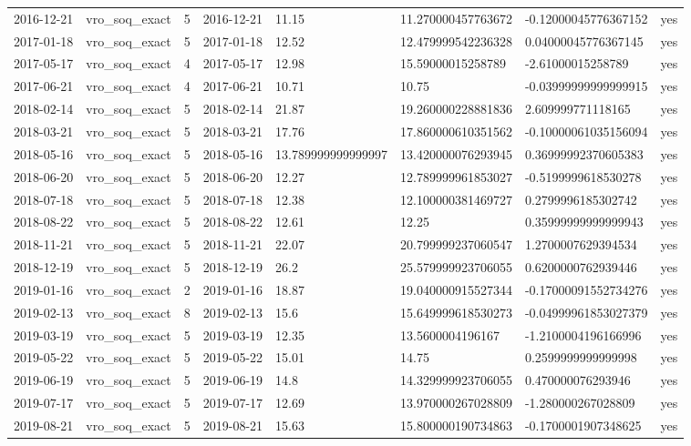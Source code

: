 \begin{tabular}{llllllll}
2016-12-21 & vro\_soq\_exact & 5 & 2016-12-21 & 11.15 & 11.270000457763672 & -0.12000045776367152 & yes \\
2017-01-18 & vro\_soq\_exact & 5 & 2017-01-18 & 12.52 & 12.479999542236328 & 0.04000045776367145 & yes \\
2017-05-17 & vro\_soq\_exact & 4 & 2017-05-17 & 12.98 & 15.59000015258789 & -2.61000015258789 & yes \\
2017-06-21 & vro\_soq\_exact & 4 & 2017-06-21 & 10.71 & 10.75 & -0.03999999999999915 & yes \\
2018-02-14 & vro\_soq\_exact & 5 & 2018-02-14 & 21.87 & 19.260000228881836 & 2.609999771118165 & yes \\
2018-03-21 & vro\_soq\_exact & 5 & 2018-03-21 & 17.76 & 17.860000610351562 & -0.10000061035156094 & yes \\
2018-05-16 & vro\_soq\_exact & 5 & 2018-05-16 & 13.789999999999997 & 13.420000076293945 & 0.36999992370605383 & yes \\
2018-06-20 & vro\_soq\_exact & 5 & 2018-06-20 & 12.27 & 12.789999961853027 & -0.5199999618530278 & yes \\
2018-07-18 & vro\_soq\_exact & 5 & 2018-07-18 & 12.38 & 12.100000381469727 & 0.2799996185302742 & yes \\
2018-08-22 & vro\_soq\_exact & 5 & 2018-08-22 & 12.61 & 12.25 & 0.35999999999999943 & yes \\
2018-11-21 & vro\_soq\_exact & 5 & 2018-11-21 & 22.07 & 20.799999237060547 & 1.2700007629394534 & yes \\
2018-12-19 & vro\_soq\_exact & 5 & 2018-12-19 & 26.2 & 25.579999923706055 & 0.6200000762939446 & yes \\
2019-01-16 & vro\_soq\_exact & 2 & 2019-01-16 & 18.87 & 19.040000915527344 & -0.17000091552734276 & yes \\
2019-02-13 & vro\_soq\_exact & 8 & 2019-02-13 & 15.6 & 15.649999618530273 & -0.04999961853027379 & yes \\
2019-03-19 & vro\_soq\_exact & 5 & 2019-03-19 & 12.35 & 13.5600004196167 & -1.2100004196166996 & yes \\
2019-05-22 & vro\_soq\_exact & 5 & 2019-05-22 & 15.01 & 14.75 & 0.2599999999999998 & yes \\
2019-06-19 & vro\_soq\_exact & 5 & 2019-06-19 & 14.8 & 14.329999923706055 & 0.470000076293946 & yes \\
2019-07-17 & vro\_soq\_exact & 5 & 2019-07-17 & 12.69 & 13.970000267028809 & -1.280000267028809 & yes \\
2019-08-21 & vro\_soq\_exact & 5 & 2019-08-21 & 15.63 & 15.800000190734863 & -0.1700001907348625 & yes \\

\end{tabular}
